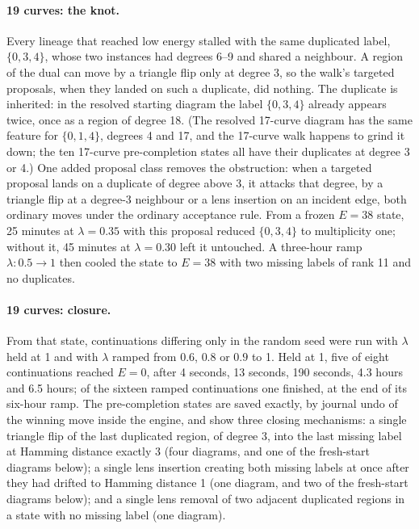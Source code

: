 \documentclass[11pt]{article}
\begin{document}
\paragraph{19 curves: the knot.} Every lineage that reached low energy stalled with the same duplicated label,
$\{0,3,4\}$, whose two instances had degrees 6--9 and shared a neighbour. A region of the dual can move by a triangle
flip only at degree 3, so the walk's targeted proposals, when they landed on such a duplicate, did nothing. The
duplicate is inherited: in the resolved starting diagram the label $\{0,3,4\}$ already appears twice, once as a region
of degree 18. (The resolved 17-curve diagram has the same feature for $\{0,1,4\}$, degrees 4 and 17, and the
17-curve walk happens to grind it down; the ten 17-curve pre-completion states all have their duplicates at degree 3
or 4.) One added proposal class removes the obstruction: when a targeted proposal lands on a duplicate of degree
above 3, it attacks that degree, by a triangle flip at a degree-3 neighbour or a lens insertion on an incident edge,
both ordinary moves under the ordinary acceptance rule. From a frozen $E=38$ state, 25 minutes at $\lambda=0.35$ with
this proposal reduced $\{0,3,4\}$ to multiplicity one; without it, 45 minutes at $\lambda=0.30$ left it untouched.
A three-hour ramp $\lambda: 0.5\to1$ then cooled the state to $E=38$ with two missing labels of rank 11 and no
duplicates.

\paragraph{19 curves: closure.} From that state, continuations differing only in the random seed were run with
$\lambda$ held at 1 and with $\lambda$ ramped from $0.6$, $0.8$ or $0.9$ to 1. Held at 1, five of eight
continuations reached $E=0$, after 4 seconds, 13 seconds, 190 seconds, 4.3 hours and 6.5 hours; of the sixteen
ramped continuations one finished, at the end of its six-hour ramp. The pre-completion states are saved exactly, by
journal undo of the winning move inside the engine, and show three closing mechanisms: a single triangle flip of the
last duplicated region, of degree 3, into the last missing label at Hamming distance exactly 3 (four diagrams, and one of
the fresh-start diagrams below); a
single lens insertion creating both missing labels at once after they had drifted to Hamming distance 1 (one
diagram, and two of the fresh-start diagrams below); and a single lens removal of two adjacent duplicated regions in a state with no missing label (one diagram).
\end{document}
